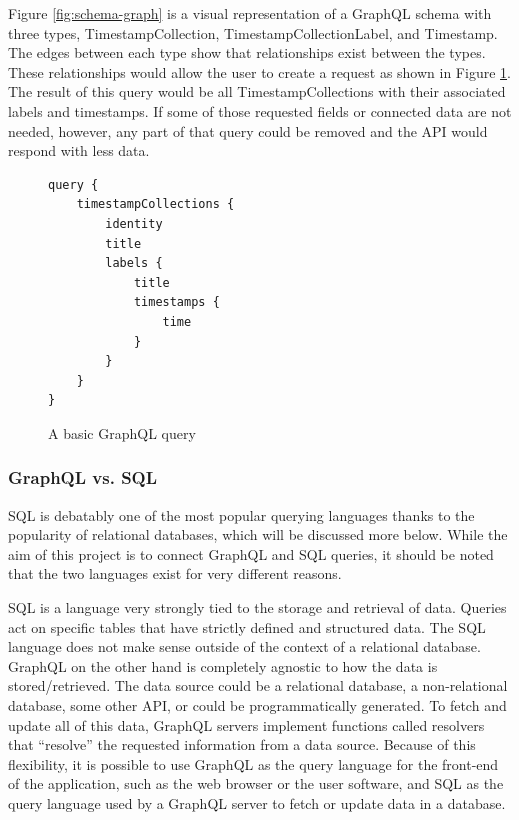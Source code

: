 Figure \ref{fig:schema-graph} is a visual representation of a GraphQL schema with three types, TimestampCollection, TimestampCollectionLabel, and Timestamp.  The edges between each type show that relationships exist between the types. These relationships  would allow the user to create a request as shown in Figure \ref{fig:basic-query}.  The result of this query would be all TimestampCollections with their associated labels and timestamps.  If some of those requested fields or connected data are not needed, however, any part of that query could be removed and the API would respond with less data.

\begin{figure}
    \begin{verbatim}
query {
    timestampCollections {
        identity
        title
        labels {
            title
            timestamps {
                time
            }
        }
    }
}
    \end{verbatim}
    \caption{A basic GraphQL query}
    \label{fig:basic-query}
\end{figure}

\subsubsection{GraphQL vs. SQL}

SQL is debatably one of the most popular querying languages thanks to the popularity of relational databases, which will be discussed more below.  While the aim of this project is to connect GraphQL and SQL queries, it should be noted that the two languages exist for very different reasons.

SQL is a language very strongly tied to the storage and retrieval of data.  Queries act on specific tables that have strictly defined and structured data.  The SQL language does not make sense outside of the context of a relational database.  GraphQL on the other hand is completely agnostic to how the data is stored/retrieved.  The data source could be a relational database, a non-relational database, some other API, or could be programmatically generated. To fetch and update all of this data, GraphQL servers implement functions called resolvers that ``resolve'' the requested information from a data source.  Because of this flexibility, it is possible to use GraphQL as the query language for the front-end of the application, such as the web browser or the user software, and SQL as the query language used by a GraphQL server to fetch or update data in a database.